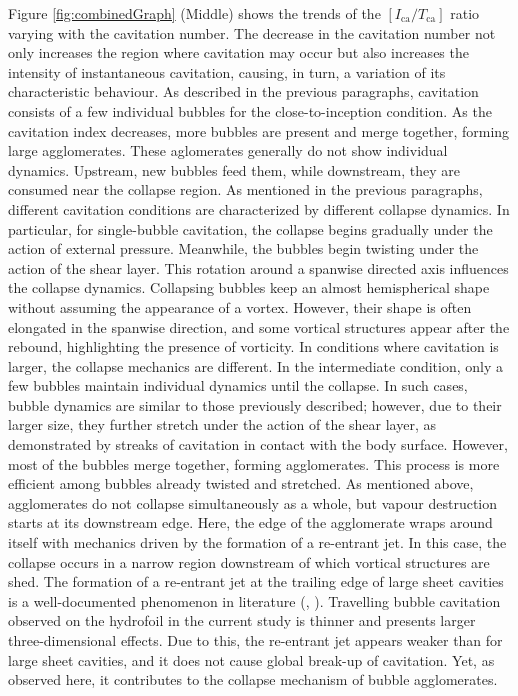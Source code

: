 Figure \ref{fig:combinedGraph} (Middle) shows the trends of the $[I_{\text{ca}} / T_{\text{ca}}]$ ratio varying with the cavitation number. The decrease in the cavitation number not only increases the region where cavitation may occur but also increases the intensity of instantaneous cavitation, causing, in turn, a variation of its characteristic behaviour.
As described in the previous paragraphs, cavitation consists of a few individual bubbles for the close-to-inception condition. As the cavitation index decreases, more bubbles are present and merge together, forming large agglomerates.
These aglomerates generally do not show individual dynamics. Upstream, new bubbles feed them, while downstream, they are consumed near the collapse region.
As mentioned in the previous paragraphs, different cavitation conditions are characterized by different collapse dynamics.
In particular, for single-bubble cavitation, the collapse begins gradually under the action of external pressure. Meanwhile, the bubbles begin twisting under the action of the shear layer.
This rotation around a spanwise directed axis influences the collapse dynamics. Collapsing bubbles keep an almost hemispherical shape without assuming the appearance of a vortex. However, their shape is often elongated in the spanwise direction, and some vortical structures appear after the rebound, highlighting the presence of vorticity.
In conditions where cavitation is larger, the collapse mechanics are different.
In the intermediate condition, only a few bubbles maintain individual dynamics until the collapse. In such cases, bubble dynamics are similar to those previously described; however, due to their larger size, they further stretch under the action of the shear layer, as demonstrated by streaks of cavitation in contact with the body surface.
However, most of the bubbles merge together, forming agglomerates. This process is more efficient among bubbles already twisted and stretched. As mentioned above, agglomerates do not collapse simultaneously as a whole, but vapour destruction starts at its downstream edge.
Here, the edge of the agglomerate wraps around itself with mechanics driven by the formation of a re-entrant jet. In this case, the collapse occurs in a narrow region downstream of which vortical structures are shed.
The formation of a re-entrant jet at the trailing edge of large sheet cavities is a well-documented phenomenon in literature (\cite{Chahine2014}, \cite{DeLange1997}). Travelling bubble cavitation observed on the hydrofoil in the current study is thinner and presents larger three-dimensional effects. Due to this, the re-entrant jet appears weaker than for large sheet cavities, and it does not cause global break-up of cavitation. Yet, as observed here, it contributes to the collapse mechanism of bubble agglomerates.

